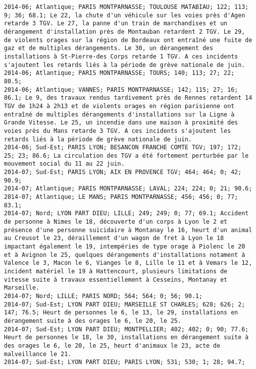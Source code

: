 \documentclass{article}
\begin{document}
\begin{Verbatim}[commandchars=\\\{\}]
2014-06; Atlantique; PARIS MONTPARNASSE; TOULOUSE MATABIAU; 122; 113; 9; 36; 68.1; Le 22, la chute d'un véhicule sur les voies près d'Agen retarde 3 TGV. Le 27, la panne d'un train de marchandises et un dérangement d'installation près de Montauban retardent 2 TGV. Le 29, de violents orages sur la région de Bordeaux ont entraîné une fuite de gaz et de multiples dérangements. Le 30, un dérangement des installations à St-Pierre-des Corps retarde 1 TGV. A ces incidents s'ajoutent les retards liés à la période de grève nationale de juin.
2014-06; Atlantique; PARIS MONTPARNASSE; TOURS; 140; 113; 27; 22; 80.5; 
2014-06; Atlantique; VANNES; PARIS MONTPARNASSE; 142; 115; 27; 16; 86.1; Le 9, des travaux rendus tardivement près de Rennes retardent 14 TGV de 1h24 à 2h13 et de violents orages en région parisienne ont entraîné de multiples dérangements d'installations sur la Ligne à Grande Vitesse. Le 25, un incendie dans une maison à proximité des voies près du Mans retarde 3 TGV. A ces incidents s'ajoutent les retards liés à la période de grève nationale de juin.
2014-06; Sud-Est; PARIS LYON; BESANCON FRANCHE COMTE TGV; 197; 172; 25; 23; 86.6; La circulation des TGV a été fortement perturbée par le mouvement social du 11 au 22 juin.
2014-07; Sud-Est; PARIS LYON; AIX EN PROVENCE TGV; 464; 464; 0; 42; 90.9; 
2014-07; Atlantique; PARIS MONTPARNASSE; LAVAL; 224; 224; 0; 21; 90.6; 
2014-07; Atlantique; LE MANS; PARIS MONTPARNASSE; 456; 456; 0; 77; 83.1; 
2014-07; Nord; LYON PART DIEU; LILLE; 249; 249; 0; 77; 69.1; Accident de personne à Nimes le 18, découverte d'un corps à Lyon le 2 et présence d'une personne suicidaire à Montanay le 16, heurt d'un animal au Creusot le 23, déraillement d'un wagon de fret à Lyon le 18 impactant également le 19, intempéries de type orage à Piolenc le 20 et à Avignon le 25, quelques dérangements d'installations notament à Valence le 3, Macon le 6, Vianges le 8, Lille le 11 et à Vemars le 12, incident matériel le 19 à Hattencourt, plusieurs limitations de vitesse suite à travaux essentiellement à Cesseins, Montanay et Marseille.
2014-07; Nord; LILLE; PARIS NORD; 564; 564; 0; 56; 90.1; 
2014-07; Sud-Est; LYON PART DIEU; MARSEILLE ST CHARLES; 628; 626; 2; 147; 76.5; Heurt de personnes le 6, le 13, le 29, installations en dérangement suite à des orages le 6, le 20, le 25.
2014-07; Sud-Est; LYON PART DIEU; MONTPELLIER; 402; 402; 0; 90; 77.6; Heurt de personnes le 18, le 30, installations en dérangement suite à des orages le 6, le 20, le 25, heurt d'animaux le 23, acte de malveillance le 21.
2014-07; Sud-Est; LYON PART DIEU; PARIS LYON; 531; 530; 1; 28; 94.7; 

\end{Verbatim}
\end{document}
